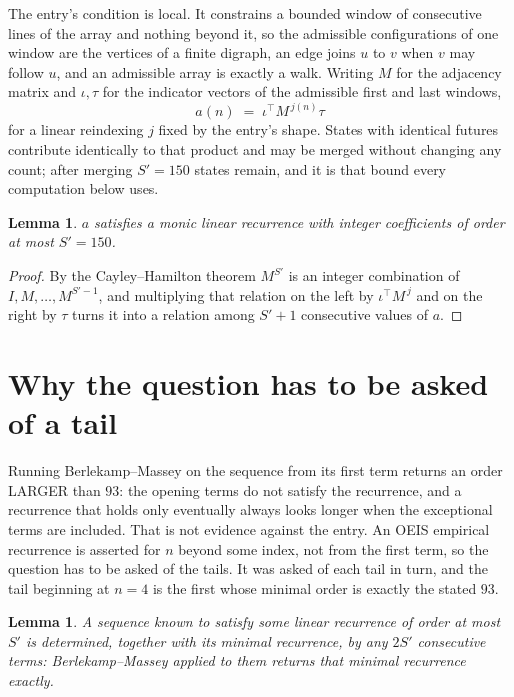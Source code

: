 \documentclass[11pt,a4paper]{article}
\theoremstyle{plain}
\newtheorem{lemma}[theorem]{Lemma}
\theoremstyle{definition}
\begin{document}
The entry's condition is local. It constrains a bounded window of consecutive lines of the
array and nothing beyond it, so the admissible configurations of one window are the vertices of
a finite digraph, an edge joins $u$ to $v$ when $v$ may follow $u$, and an admissible array is
exactly a walk. Writing $M$ for the adjacency matrix and $\iota,\tau$ for the indicator vectors
of the admissible first and last windows,
\[
a(n)\;=\;\iota^{\!\top}M^{\,j(n)}\tau
\]
for a linear reindexing $j$ fixed by the entry's shape. States with identical futures
contribute identically to that product and may be merged without changing any count; after
merging $S'=150$ states remain, and it is that bound every computation below uses.

\begin{lemma}\label{lem:cf}
$a$ satisfies a monic linear recurrence with integer coefficients of order at most $S'=150$.
\end{lemma}

\begin{proof}
By the Cayley--Hamilton theorem $M^{S'}$ is an integer combination of $I,M,\dots,M^{S'-1}$,
and multiplying that relation on the left by $\iota^{\!\top}M^{\,j}$ and on the right by
$\tau$ turns it into a relation among $S'+1$ consecutive values of $a$.
\end{proof}

\section{Why the question has to be asked of a tail}

Running Berlekamp--Massey on the sequence from its first term returns an order LARGER than $93$: the opening terms do not satisfy the recurrence, and a recurrence that holds only eventually always looks longer when the exceptional terms are included. That is not evidence against the entry. An OEIS empirical recurrence is asserted for $n$ beyond some index, not from the first term, so the question has to be asked of the tails. It was asked of each tail in turn, and the tail beginning at $n=4$ is the first whose minimal order is exactly the stated $93$.

\begin{lemma}\label{lem:bm}
A sequence known to satisfy some linear recurrence of order at most $S'$ is determined,
together with its minimal recurrence, by any $2S'$ consecutive terms: Berlekamp--Massey applied
to them returns that minimal recurrence exactly.
\end{lemma}
\end{document}
